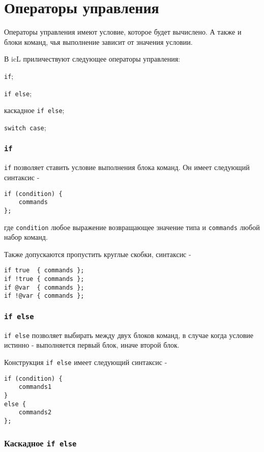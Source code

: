 \section{Операторы управления}

Операторы управления имеют условие, которое будет вычислено. А также и блоки команд, чья выполнение зависит от значения условии.

В icL приличествуют следующее операторы управления:
\begin{icItems}
	\item \texttt{if};
	\item \texttt{if else};
	\item каскадное \texttt{if else};
	\item \texttt{switch case};
\end{icItems}

\subsubsection{\texttt{if}}

\texttt{if} позволяет ставить условие выполнения блока команд. Он имеет следующий синтаксис -
\begin{verbatim}
if (condition) {
	commands
};
\end{verbatim}
где \texttt{condition} любое выражение возвращающее значение типа \bool{} и \texttt{commands} любой набор команд.

Также допускаются пропустить круглые скобки, синтаксис -
\begin{verbatim}
if true  { commands };
if !true { commands };
if @var  { commands };
if !@var { commands };
\end{verbatim}

\subsubsection{\texttt{if else}}

\texttt{if else} позволяет выбирать между двух блоков команд, в случае когда условие истинно - выполняется первый блок, иначе второй блок.

Конструкция \texttt{if else} имеет следующий синтаксис -
\begin{verbatim}
if (condition) {
	commands1
}
else {
	commands2
};
\end{verbatim}

\subsubsection{Каскадное \texttt{if else}}

